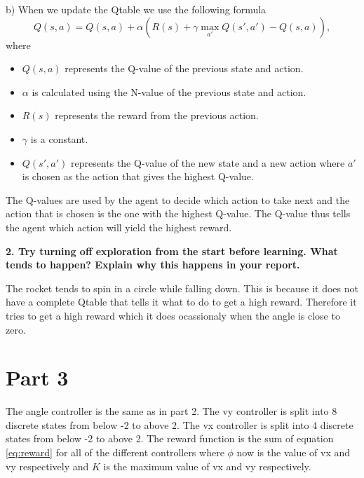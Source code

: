 \documentclass[a4paper,10pt]{article}
\begin{document}
b)
When we update the Qtable we use the following formula
\begin{equation*}
    Q(s, a) = Q(s, a) + \alpha(R(s) + \gamma \max_{a'}Q(s', a') - Q(s,a)),
\end{equation*}
where 
\begin{itemize}
    \item $Q(s, a)$ represents the Q-value of the previous state and action.
    \item $\alpha$ is calculated using the N-value of the previous state and action.
    \item $R(s)$ represents the reward from the previous action.
    \item $\gamma$ is a constant. 
    \item $Q(s', a')$ represents the Q-value of the new state and a new action where $a'$
    is chosen as the action that gives the highest Q-value.
\end{itemize}
The Q-values are used by the agent to decide which action to take next and the action that is chosen is the
one with the highest Q-value. The Q-value thus tells the agent which action will yield the highest reward.

\textbf{2. Try turning off exploration from the start before learning.
  What tends to happen? Explain why this happens in your report.}

The rocket tends to spin in a circle while falling down.
This is because it does not have a complete Qtable that tells it what to do to get a high reward.
Therefore it tries to get a high reward which it does ocassionaly when the angle is close to zero.

\section*{Part 3}

The angle controller is the same as in part 2.
The vy controller is split into 8 discrete states from below -2 to above 2.
The vx controller is split into 4 discrete states from below -2 to above 2.
The reward function is the sum of equation \eqref{eq:reward} for all of the different controllers where $\phi$ now is
the value of vx and vy respectively and $K$ is the maximum value of vx and vy respectively.
\end{document}
